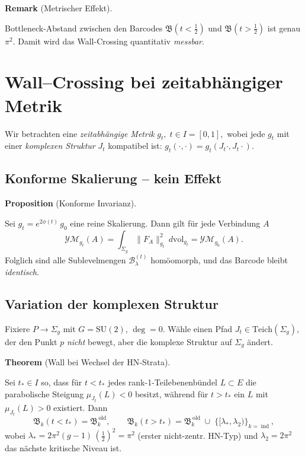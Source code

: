 \documentclass[10pt, letterpaper]{article}
\newcommand{\CustomHeading}[3]{%
  \par\medskip\noindent%
  \textbf{#1 #2} \textnormal{(#3)}.\enskip%
}
\newenvironment{PROP}[2]{\CustomHeading{Proposition}{#1}{#2}}{}
\newenvironment{THEO}[2]{\CustomHeading{Theorem}{#1}{#2}}{}
\newenvironment{REM}[2]{\CustomHeading{Remark}{#1}{#2}}{}
\begin{document}
\begin{REM}{}{Metrischer Effekt}
  Bottleneck-Abstand zwischen den Barcodes
  \(\mathfrak B(t<\tfrac12)\) und \(\mathfrak B(t>\tfrac12)\)
  ist genau \(\pi^2\).
  Damit wird das Wall-Crossing quantitativ \emph{messbar}.
\end{REM}


\section{Wall--Crossing bei zeitabhängiger Metrik}

Wir betrachten eine \emph{zeitabhängige Metrik}
\(
  g_t,\;t\in I=[0,1],
\)
wobei jede $g_t$ mit einer \emph{komplexen Struktur} $J_t$ kompatibel ist:
\(g_t(\cdot,\cdot)=g_t(J_t\cdot,J_t\cdot)\).

\subsection{Konforme Skalierung – kein Effekt}

\begin{PROP}{}{Konforme Invarianz}
  Sei $g_t = e^{2\phi(t)}\,g_0$ eine reine Skalierung.
  Dann gilt für jede Verbindung $A$
  \[
    \mathcal{YM}_{g_t}(A)
     =\int_{\Sigma_g}\!\|F_A\|_{g_t}^{2}\,d\mathrm{vol}_{g_t}
     =\mathcal{YM}_{g_0}(A).
  \]
  Folglich sind alle Sublevelmengen
  \(\mathcal B_\lambda^{(t)}\)
  homöomorph, und das Barcode bleibt \emph{identisch}.
\end{PROP}

\subsection{Variation der komplexen Struktur}

Fixiere $P\to\Sigma_g$ mit $G=\mathrm{SU}(2)$, $\deg=0$.
Wähle einen Pfad
\(
  J_t\in\mathrm{Teich}(\Sigma_g),
\)
der den Punkt $p$ \emph{nicht} bewegt, aber die komplexe Struktur auf $\Sigma_g$ ändert.

\begin{THEO}{}{Wall bei Wechsel der HN‐Strata}
  Sei $t_\ast\in I$ so, dass für $t<t_\ast$ jedes rank-1-Teilebenen­bündel
  $L\subset E$ die parabolische Steigung
  \(\mu_{J_t}(L)<0\) besitzt, während für $t>t_\ast$
  ein $L$ mit \(\mu_{J_t}(L)>0\) existiert.  \newline
  Dann
  \[
    \mathfrak B_k(t<t_\ast)=\mathfrak B_k^{\mathrm{\,old}},\qquad
    \mathfrak B_k(t>t_\ast)=\mathfrak B_k^{\mathrm{\,old}}\;\cup\;
                               \bigl\{[\lambda_\ast,\lambda_2)\bigr\}_{k=\operatorname{ind}},
  \]
  wobei
  \(
    \lambda_\ast = 2\pi^{2}(g-1)\,(\tfrac12)^2=\pi^{2}
  \)
  (erster nicht-zentr. HN-Typ)  
  und \(\lambda_2=2\pi^{2}\) das nächste kritische Niveau ist.
\end{THEO}
\end{document}
